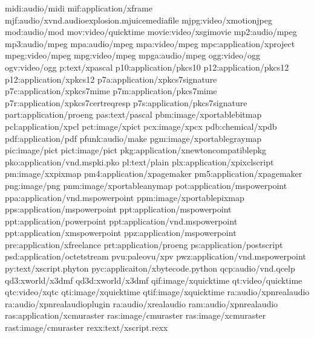\documentclass[letterpaper,12pt,english]{sphinxmanual}
\begin{document}
\begin{sphinxVerbatim}[commandchars=\\\{\}]
midi:audio/midi
mif:application/x\PYGZhy{}frame
mjf:audio/x\PYGZhy{}vnd.audioexplosion.mjuicemediafile
mjpg:video/x\PYGZhy{}motion\PYGZhy{}jpeg
mod:audio/mod
mov:video/quicktime
movie:video/x\PYGZhy{}sgi\PYGZhy{}movie
mp2:audio/mpeg
mp3:audio/mpeg
\PYGZsh{}mpa:audio/mpeg
mpa:video/mpeg
mpc:application/x\PYGZhy{}project
mpeg:video/mpeg
mpg:video/mpeg
mpga:audio/mpeg
ogg:video/ogg
ogv:video/ogg
p:text/x\PYGZhy{}pascal
p10:application/pkcs10
\PYGZsh{}p12:application/pkcs\PYGZhy{}12
p12:application/x\PYGZhy{}pkcs12
p7a:application/x\PYGZhy{}pkcs7\PYGZhy{}signature
p7c:application/x\PYGZhy{}pkcs7\PYGZhy{}mime
p7m:application/pkcs7\PYGZhy{}mime
p7r:application/x\PYGZhy{}pkcs7\PYGZhy{}certreqresp
p7s:application/pkcs7\PYGZhy{}signature
part:application/pro\PYGZus{}eng
pas:text/pascal
pbm:image/x\PYGZhy{}portable\PYGZhy{}bitmap
pcl:application/x\PYGZhy{}pcl
pct:image/x\PYGZhy{}pict
pcx:image/x\PYGZhy{}pcx
pdb:chemical/x\PYGZhy{}pdb
pdf:application/pdf
pfunk:audio/make
pgm:image/x\PYGZhy{}portable\PYGZhy{}graymap
pic:image/pict
pict:image/pict
pkg:application/x\PYGZhy{}newton\PYGZhy{}compatible\PYGZhy{}pkg
pko:application/vnd.ms\PYGZhy{}pki.pko
pl:text/plain
plx:application/x\PYGZhy{}pixclscript
pm:image/x\PYGZhy{}xpixmap
pm4:application/x\PYGZhy{}pagemaker
pm5:application/x\PYGZhy{}pagemaker
png:image/png
pnm:image/x\PYGZhy{}portable\PYGZhy{}anymap
pot:application/mspowerpoint
ppa:application/vnd.ms\PYGZhy{}powerpoint
ppm:image/x\PYGZhy{}portable\PYGZhy{}pixmap
pps:application/mspowerpoint
ppt:application/mspowerpoint
\PYGZsh{}ppt:application/powerpoint
\PYGZsh{}ppt:application/vnd.ms\PYGZhy{}powerpoint
\PYGZsh{}ppt:application/x\PYGZhy{}mspowerpoint
ppz:application/mspowerpoint
pre:application/x\PYGZhy{}freelance
prt:application/pro\PYGZus{}eng
ps:application/postscript
psd:application/octet\PYGZhy{}stream
pvu:paleovu/x\PYGZhy{}pv
pwz:application/vnd.ms\PYGZhy{}powerpoint
py:text/x\PYGZhy{}script.phyton
pyc:applicaiton/x\PYGZhy{}bytecode.python
qcp:audio/vnd.qcelp
qd3:x\PYGZhy{}world/x\PYGZhy{}3dmf
\PYGZsh{}qd3d:x\PYGZhy{}world/x\PYGZhy{}3dmf
qif:image/x\PYGZhy{}quicktime
qt:video/quicktime
qtc:video/x\PYGZhy{}qtc
qti:image/x\PYGZhy{}quicktime
qtif:image/x\PYGZhy{}quicktime
ra:audio/x\PYGZhy{}pn\PYGZhy{}realaudio
\PYGZsh{}ra:audio/x\PYGZhy{}pn\PYGZhy{}realaudio\PYGZhy{}plugin
\PYGZsh{}ra:audio/x\PYGZhy{}realaudio
ram:audio/x\PYGZhy{}pn\PYGZhy{}realaudio
ras:application/x\PYGZhy{}cmu\PYGZhy{}raster
\PYGZsh{}ras:image/cmu\PYGZhy{}raster
\PYGZsh{}ras:image/x\PYGZhy{}cmu\PYGZhy{}raster
\PYGZsh{}rast:image/cmu\PYGZhy{}raster
\PYGZsh{}rexx:text/x\PYGZhy{}script.rexx

\end{sphinxVerbatim}
\end{document}
